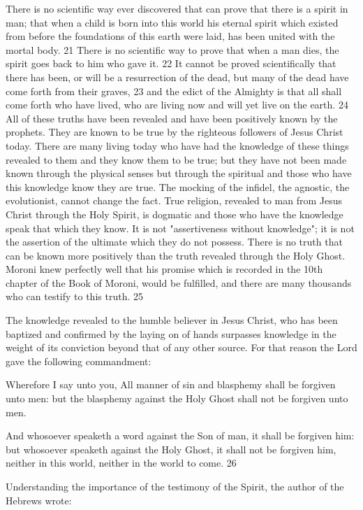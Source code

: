 There is no scientific way ever discovered that can prove that there is a spirit in man; that
when a child is born into this world his eternal spirit which existed from before the
foundations of this earth were laid, has been united with the mortal body. 21 There is no
scientific way to prove that when a man dies, the spirit goes back to him who gave it. 22 It
cannot be proved scientifically that there has been, or will be a resurrection of the dead, but
many of the dead have come forth from their graves, 23 and the edict of the Almighty is that
all shall come forth who have lived, who are living now and will yet live on the earth. 24 All
of these truths have been revealed and have been positively known by the prophets. They are
known to be true by the righteous followers of Jesus Christ today. There are many living
today who have had the knowledge of these things revealed to them and they know them to
be true; but they have not been made known through the physical senses but through the
spiritual and those who have this knowledge know they are true. The mocking of the infidel,
the agnostic, the evolutionist, cannot change the fact. True religion, revealed to man from
Jesus Christ through the Holy Spirit, is dogmatic and those who have the knowledge speak
that which they know. It is not "assertiveness without knowledge"; it is not the assertion of
the ultimate which they do not possess. There is no truth that can be known more positively
than the truth revealed through the Holy Ghost. Moroni knew perfectly well that his promise
which is recorded in the 10th chapter of the Book of Moroni, would be fulfilled, and there are
many thousands who can testify to this truth. 25

The knowledge revealed to the humble believer in Jesus Christ, who has been baptized and
confirmed by the laying on of hands surpasses knowledge in the weight of its conviction
beyond that of any other source. For that reason the Lord gave the following commandment:

Wherefore I say unto you, All manner of sin and blasphemy shall be forgiven unto men: but
the blasphemy against the Holy Ghost shall not be forgiven unto men.

And whosoever speaketh a word against the Son of man, it shall be forgiven him: but
whosoever speaketh against the Holy Ghost, it shall not be forgiven him, neither in this
world, neither in the world to come. 26

Understanding the importance of the testimony of the Spirit, the author of the Hebrews
wrote:

